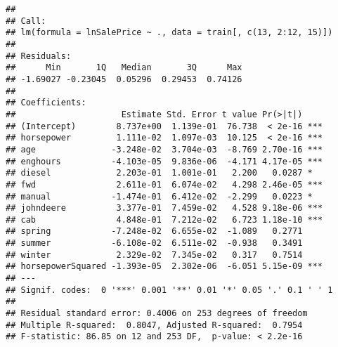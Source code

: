 \documentclass[
]{article}
\newenvironment{Shaded}{\begin{snugshade}}{\end{snugshade}}
\newcommand{\AttributeTok}[1]{\textcolor[rgb]{0.77,0.63,0.00}{#1}}
\newcommand{\CommentTok}[1]{\textcolor[rgb]{0.56,0.35,0.01}{\textit{#1}}}
\newcommand{\DecValTok}[1]{\textcolor[rgb]{0.00,0.00,0.81}{#1}}
\newcommand{\FunctionTok}[1]{\textcolor[rgb]{0.00,0.00,0.00}{#1}}
\newcommand{\NormalTok}[1]{#1}
\newcommand{\SpecialCharTok}[1]{\textcolor[rgb]{0.00,0.00,0.00}{#1}}
\newcommand{\StringTok}[1]{\textcolor[rgb]{0.31,0.60,0.02}{#1}}
\begin{document}
\begin{verbatim}
## 
## Call:
## lm(formula = lnSalePrice ~ ., data = train[, c(13, 2:12, 15)])
## 
## Residuals:
##      Min       1Q   Median       3Q      Max 
## -1.69027 -0.23045  0.05296  0.29453  0.74126 
## 
## Coefficients:
##                     Estimate Std. Error t value Pr(>|t|)    
## (Intercept)        8.737e+00  1.139e-01  76.738  < 2e-16 ***
## horsepower         1.111e-02  1.097e-03  10.125  < 2e-16 ***
## age               -3.248e-02  3.704e-03  -8.769 2.70e-16 ***
## enghours          -4.103e-05  9.836e-06  -4.171 4.17e-05 ***
## diesel             2.203e-01  1.001e-01   2.200   0.0287 *  
## fwd                2.611e-01  6.074e-02   4.298 2.46e-05 ***
## manual            -1.474e-01  6.412e-02  -2.299   0.0223 *  
## johndeere          3.377e-01  7.459e-02   4.528 9.18e-06 ***
## cab                4.848e-01  7.212e-02   6.723 1.18e-10 ***
## spring            -7.248e-02  6.655e-02  -1.089   0.2771    
## summer            -6.108e-02  6.511e-02  -0.938   0.3491    
## winter             2.329e-02  7.345e-02   0.317   0.7514    
## horsepowerSquared -1.393e-05  2.302e-06  -6.051 5.15e-09 ***
## ---
## Signif. codes:  0 '***' 0.001 '**' 0.01 '*' 0.05 '.' 0.1 ' ' 1
## 
## Residual standard error: 0.4006 on 253 degrees of freedom
## Multiple R-squared:  0.8047, Adjusted R-squared:  0.7954 
## F-statistic: 86.85 on 12 and 253 DF,  p-value: < 2.2e-16
\end{verbatim}

\begin{Shaded}
\end{Shaded}
\end{document}
